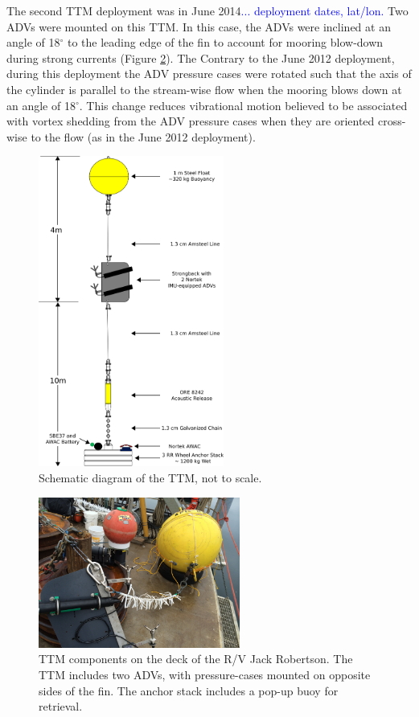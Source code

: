 \documentclass[twocol]{ametsoc}
\newcommand{\note}[1]{\textcolor{blue}{#1}}
\begin{document}
The second TTM deployment was in June 2014\note{... deployment dates, lat/lon.} Two ADVs were mounted on this TTM. In this case, the ADVs were inclined at an angle of 18$^\circ$ to the leading edge of the fin to account for mooring blow-down during strong currents (Figure \ref{fig:ttm:photo}). The Contrary to the June 2012 deployment, during this deployment the ADV pressure cases were rotated such that the axis of the cylinder is parallel to the stream-wise flow when the mooring blows down at an angle of 18$^\circ$. This change reduces vibrational motion believed to be associated with vortex shedding from the ADV pressure cases when they are oriented cross-wise to the flow (as in the June 2012 deployment).

\begin{figure}[t]
  \centering
  \includegraphics[width=2.4in]{ttm04b}
  \caption{Schematic diagram of the TTM, not to scale.}
  \label{fig:ttm:diagram}
\end{figure}

\begin{figure}[t]
  \centering
  \includegraphics[width=2.6in]{TTM_image01}  
  \caption{TTM components on the deck of the R/V Jack Robertson. The TTM includes two ADVs, with pressure-cases mounted on opposite sides of the fin. The anchor stack includes a pop-up buoy for retrieval. }
  \label{fig:ttm:photo}
\end{figure}
\end{document}
